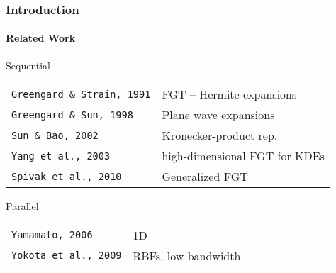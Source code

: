 \begin{frame}
\frametitle{Introduction }
\framesubtitle{Related Work}
\begin{block}{Sequential}
{\footnotesize
\begin{table}[htbp]
\centering
\begin{tabular}{ll} 
\texttt{Greengard \& Strain, 1991} & FGT -- Hermite expansions \\
\texttt{Greengard \& Sun, 1998} & Plane wave expansions \\
\texttt{Sun \& Bao, 2002} & Kronecker-product rep. \\
\texttt{Yang et al., 2003} & high-dimensional FGT for KDEs \\ 
\texttt{Spivak et al., 2010} & Generalized FGT \\
\end{tabular}
\end{table}
}
\end{block}

\begin{block}{Parallel}
{\footnotesize
\begin{table}[htbp]
\centering
\begin{tabular}{ll} 
\texttt{Yamamato, 2006} & 1D \\
\texttt{Yokota et al., 2009} & RBFs, low bandwidth \\
\end{tabular}
\end{table}
}

\end{block}
\end{frame}

